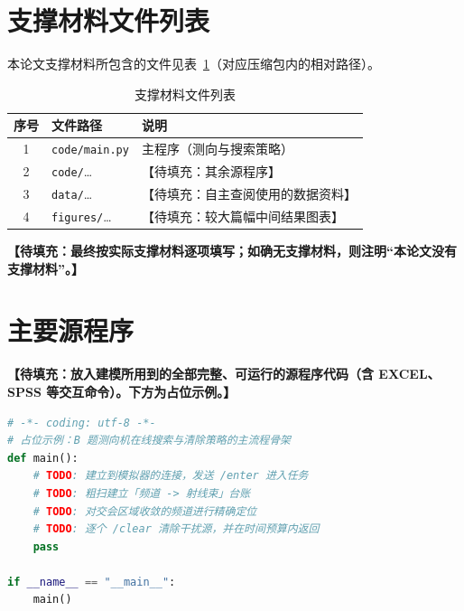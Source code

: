 \begin{appendices}

\section{支撑材料文件列表}
本论文支撑材料所包含的文件见表~\ref{tab:files}（对应压缩包内的相对路径）。

\begin{table}[!htbp]
    \caption{支撑材料文件列表}\label{tab:files}
    \centering
    \begin{tabular}{cll}
        \toprule
        序号 & 文件路径 & 说明 \\
        \midrule
        1 & \texttt{code/main.py}      & 主程序（测向与搜索策略） \\
        2 & \texttt{code/}…            & 【待填充：其余源程序】 \\
        3 & \texttt{data/}…            & 【待填充：自主查阅使用的数据资料】 \\
        4 & \texttt{figures/}…         & 【待填充：较大篇幅中间结果图表】 \\
        \bottomrule
    \end{tabular}
\end{table}

\textbf{【待填充：最终按实际支撑材料逐项填写；如确无支撑材料，则注明“本论文没有
支撑材料”。】}

\section{主要源程序}
\textbf{【待填充：放入建模所用到的全部完整、可运行的源程序代码（含 EXCEL、SPSS
等交互命令）。下方为占位示例。】}

\begin{lstlisting}[language=python, caption={测向与搜索策略主程序（占位示例）}]
# -*- coding: utf-8 -*-
# 占位示例：B 题测向机在线搜索与清除策略的主流程骨架
def main():
    # TODO: 建立到模拟器的连接，发送 /enter 进入任务
    # TODO: 粗扫建立「频道 -> 射线束」台账
    # TODO: 对交会区域收敛的频道进行精确定位
    # TODO: 逐个 /clear 清除干扰源，并在时间预算内返回
    pass

if __name__ == "__main__":
    main()
\end{lstlisting}

\end{appendices}
